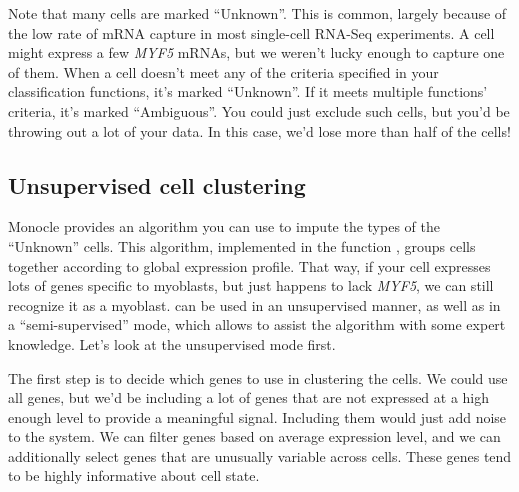 \documentclass[10pt,oneside]{article}\usepackage[]{graphicx}\usepackage[]{color}
\begin{document}
 Note that many cells are marked ``Unknown''. This is common, largely because of the low rate of mRNA capture in most single-cell RNA-Seq experiments. A cell might express a few \emph{MYF5} mRNAs, but we weren't lucky enough to capture one of them. When a cell doesn't meet any of the criteria specified in your classification functions, it's marked ``Unknown''. If it meets multiple functions' criteria, it's marked ``Ambiguous''. You could just exclude such cells, but you'd be throwing out a lot of your data. In this case, we'd lose more than half of the cells!

\subsection{Unsupervised cell clustering}
Monocle provides an algorithm you can use to impute the types of the ``Unknown'' cells. This algorithm, implemented in the function , groups cells together according to global expression profile. That way, if your cell expresses lots of genes specific to myoblasts, but just happens to lack \emph{MYF5}, we can still recognize it as a myoblast.  can be used in an unsupervised manner, as well as in a ``semi-supervised'' mode, which allows to assist the algorithm with some expert knowledge. Let's look at the unsupervised mode first.

The first step is to decide which genes to use in clustering the cells. We could use all genes, but we'd be including a lot of genes that are not expressed at a high enough level to provide a meaningful signal. Including them would just add noise to the system. We can filter genes based on average expression level, and we can additionally select genes that are unusually variable across cells. These genes tend to be highly informative about cell state.
\end{document}

